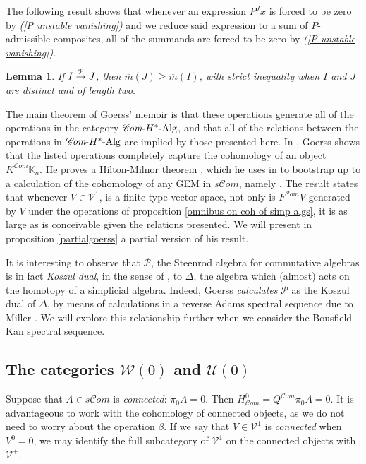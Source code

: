 \documentclass[11pt]{amsart}
\theoremstyle{plain}
\newtheorem{lem}[thm]{Lemma}
\theoremstyle{definition}
\newcommand{\scrC}{\mathscr{C}}
\newcommand{\calU}{\mathcal{U}}
\newcommand{\calP}{\mathcal{P}}
\newcommand{\calV}{\mathcal{V}}
\newcommand{\calw}{\mathcal{W}}
\theoremstyle{plain}
\newcommand{\Palg}{{\calP}}
\newcommand{\deltaalg}{\Delta} %
\newcommand{\vect}[2]{\calV^{#1}_{#2}}
\newcommand{\HAlg}{\textup{-$H^*$-Alg}}
\newcommand{\minDimP}{\overline{m}}
\newcommand{\produces}[3]{#3:#1\sim #2}
\renewcommand{\produces}[3]{#1\rightarrow_{#3} #2}%
\renewcommand{\produces}[3]{#1\overset{\smash{#3}}{\rightarrow} #2}%
\newcommand{\algs}{{\scrC\!\textit{om}}}
\begin{document}
\begin{Constructing (co)homotopy operations}
The following result shows that whenever an expression $P^Jx$ is forced to be zero by \emph{(\ref{P unstable vanishing})}  and we reduce said expression to a sum of $P$-admissible composites, all of the summands are forced to be zero by \emph{(\ref{P unstable vanishing})}.
\begin{lem}\label{lemOnAdemChangeInMP}
If $\produces{I}{J}{\Palg}$, then $\minDimP(J) \geq \minDimP(I)$, with strict inequality when $I$ and $J$ are distinct and of length two.
\end{lem}
The main theorem of Goerss' memoir is that these operations generate all of the operations in the category $\algs\HAlg$, and that all of the relations between the operations in $\algs\HAlg$ are implied by those presented here. In \cite[Chapter V]{MR1089001}, Goerss shows that the listed operations completely capture the cohomology of an object $K^{\algs}\mathbb{K}_n$. He proves a Hilton-Milnor theorem \cite{GoerssHiltonMilnor.pdf}, which he uses in \cite[\S11]{MR1089001} to bootstrap up to a calculation of the cohomology of any GEM in $s\algs$, namely \cite[Theorem I]{MR1089001}. The result states that whenever $V\in \vect{1}{}$,  is a finite-type vector space, not only is 
$F^{\algs}V$
generated by $V$ under the operations of proposition \ref{omnibus on coh of simp algs}, it is as large as is conceivable given the relations presented. We will present in proposition \ref{partialgoerss} a partial version of his result.

It is  interesting to observe that $\Palg$, the Steenrod algebra for commutative algebras is
in fact \emph{Koszul dual}, in the sense of \cite{PriddyKoszul.pdf}, to $\deltaalg$, the algebra which (almost) acts on the homotopy of a simplicial algebra. Indeed, Goerss \emph{calculates} $\Palg$ as the Koszul dual of $\deltaalg$, by means of calculations in a reverse Adams spectral sequence due to Miller \cite{MillerSullivanConjecture.pdf}. We will explore this relationship further when we consider the Bousfield-Kan spectral sequence.

\subsection{The categories $\calw(0)$ and $\calU(0)$}
Suppose that $A\in s\algs$ is \emph{connected}: $\pi_0A=0$. Then $H^0_{\algs}=Q^{\algs}\pi_0A=0$. It is advantageous to work with the cohomology of connected objects, as we do not need to worry about the operation $\beta$. If we say that $V\in \vect{1}{}$ is \emph{connected} when $V^{0}=0$, we may identify the full subcategory of $\vect{1}{}$ on the connected objects with $\vect{+}{}$.


\end{Constructing (co)homotopy operations}
\end{document}
